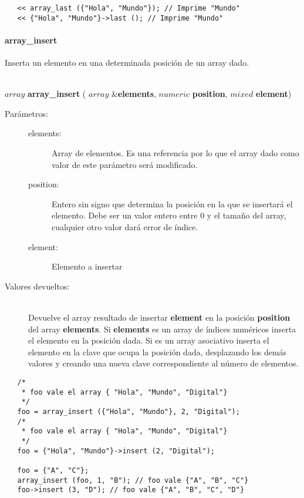 \begin{lstlisting}   
   << array_last ({"Hola", "Mundo"}); // Imprime "Mundo"
   << {"Hola", "Mundo"}->last (); // Imprime "Mundo"
\end{lstlisting}

\paragraph{array\_insert}
Inserta un elemento en una determinada posición de un array dado.

\begin{framed}
\hfill \\ $array$ \textbf{array\_insert} ( $array$ \&\textbf{elements}, $numeric$ \textbf{position}, $mixed$ \textbf{element})  
\begin{description}
\item [Parámetros:] \hfill 
   \begin{description}
   \item[elements:] Array de elementos. Es una referencia por lo que el array dado como valor de este parámetro será modificado. 
   \item[position:] Entero sin signo que determina la posición en la que se insertará el elemento. Debe ser un valor entero entre $0$ y
   el tamaño del array, cualquier otro valor dará error de índice.
   \item[element:] Elemento a insertar
   \end{description}
\item[Valores devueltos:] \hfill \\
   Devuelve el array resultado de insertar \textbf{element} en la posición \textbf{position} del array \textbf{elements}.
   Si \textbf{elements} es un array de índices numéricos inserta el elemento en la posición dada. Si 
   es un array asociativo inserta el elemento en la clave que ocupa la posición dada, desplazando los demás valores y creando
   una nueva clave correspondiente al número de elementos.
\end{description}
\end{framed}
     
\begin{lstlisting}   
   /*
    * foo vale el array { "Hola", "Mundo", "Digital"}
    */
   foo = array_insert ({"Hola", "Mundo"}, 2, "Digital"); 
   /*
    * foo vale el array { "Hola", "Mundo", "Digital"}
    */
   foo = {"Hola", "Mundo"}->insert (2, "Digital");
   
   foo = {"A", "C"};
   array_insert (foo, 1, "B"); // foo vale {"A", "B", "C"}
   foo->insert (3, "D"); // foo vale {"A", "B", "C", "D"}
\end{lstlisting}

